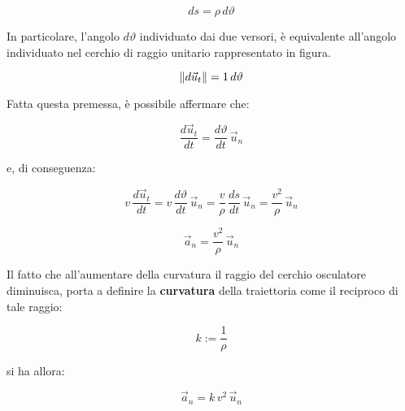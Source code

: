 \[
	ds=\rho\,d\vartheta
\]

In particolare, l'angolo $d\vartheta$ individuato dai due versori, è equivalente all'angolo individuato nel cerchio di raggio unitario rappresentato in figura.

\[
	\lVert d\vec{u}_t\rVert=1\,d\vartheta
\]

Fatta questa premessa, è possibile affermare che:

\[
	\frac{d\vec{u}_t}{dt}=\frac{d\vartheta}{dt}\,\vec{u}_n
\]

e, di conseguenza:

\[
	v\,\frac{d\vec{u}_t}{dt}= v\,\frac{d\vartheta}{dt}\,\vec{u}_n=\frac{v}{\rho}\,\frac{ds}{dt}\,\vec{u}_n=\frac{v^2}{\rho}\,\vec{u}_n
\]

\begin{equation}
	\boxed{\vec{a}_n=\frac{v^2}{\rho}\,\vec{u}_n}
\end{equation}

Il fatto che all'aumentare della curvatura il raggio del cerchio osculatore diminuisca, porta a definire la \textbf{curvatura} della traiettoria come il reciproco di tale raggio:

\[
	k:=\frac{1}{\rho}
\]

si ha allora:

\[
	\vec{a}_n=k\,{v^2}\,\vec{u}_n
\]

